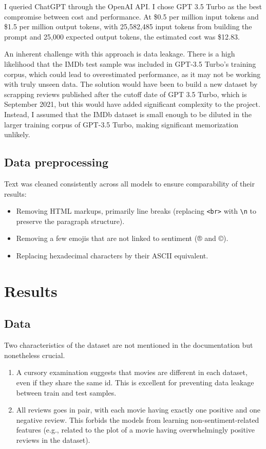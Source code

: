 \documentclass{article}
\begin{document}
I queried ChatGPT through the OpenAI API. I chose GPT 3.5 Turbo as the best compromise between cost and performance. At \$0.5 per million input tokens and \$1.5 per million output tokens, with 25,582,485 input tokens from building the prompt and 25,000 expected output tokens, the estimated cost was \$12.83.

An inherent challenge with this approach is data leakage. There is a high likelihood that the IMDb test sample was included in GPT-3.5 Turbo's training corpus, which could lead to overestimated performance, as it may not be working with truly unseen data. The solution would have been to build a new dataset by scrapping reviews published after the cutoff date of GPT 3.5 Turbo, which is September 2021, but this would have added significant complexity to the project. Instead, I assumed that the IMDb dataset is small enough to be diluted in the larger training corpus of GPT-3.5 Turbo, making significant memorization unlikely.

\subsection{Data preprocessing}

Text was cleaned consistently across all models to ensure comparability of their results:
\begin{itemize}
    \item Removing HTML markups, primarily line breaks (replacing \texttt{<br>} with \texttt{\textbackslash n} to preserve the paragraph structure).
	\item Removing a few emojis that are not linked to sentiment (® and ©).
    \item Replacing hexadecimal characters by their ASCII equivalent.
\end{itemize}

\section{Results}

\subsection{Data}

Two characteristics of the dataset are not mentioned in the documentation but nonetheless crucial.
\begin{enumerate}
    \item A cursory examination suggests that movies are different in each dataset, even if they share the same id. This is excellent for preventing data leakage between train and test samples.
	\item All reviews goes in pair, with each movie having exactly one positive and one negative review. This forbids the models from learning non-sentiment-related features (e.g., related to the plot of a movie having overwhelmingly positive reviews in the dataset).
\end{enumerate}
\end{document}
